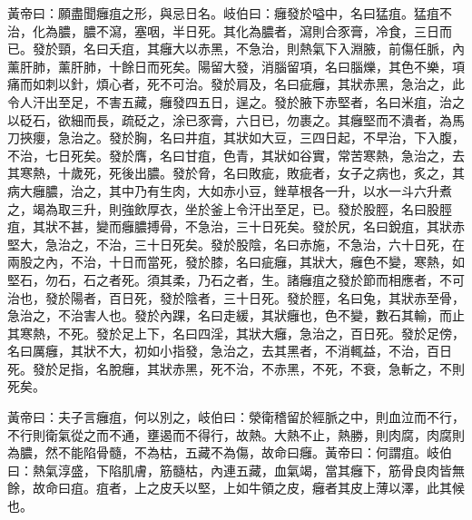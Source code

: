 黃帝曰：願盡聞癰疽之形，與忌日名。岐伯曰：癰發於嗌中，名曰猛疽。猛疽不治，化為膿，膿不瀉，塞咽，半日死。其化為膿者，瀉則合豕膏，冷食，三日而已。發於頸，名曰夭疽，其癰大以赤黑，不急治，則熱氣下入淵腋，前傷任脈，內薰肝肺，薰肝肺，十餘日而死矣。陽留大發，消腦留項，名曰腦爍，其色不樂，項痛而如刺以針，煩心者，死不可治。發於肩及，名曰疵癰，其狀赤黑，急治之，此令人汗出至足，不害五藏，癰發四五日，逞之。發於腋下赤堅者，名曰米疽，治之以砭石，欲細而長，疏砭之，涂已豕膏，六日已，勿裹之。其癰堅而不潰者，為馬刀挾癭，急治之。發於胸，名曰井疽，其狀如大豆，三四日起，不早治，下入腹，不治，七日死矣。發於膺，名曰甘疽，色青，其狀如谷實，常苦寒熱，急治之，去其寒熱，十歲死，死後出膿。發於脅，名曰敗疵，敗疵者，女子之病也，炙之，其病大癰膿，治之，其中乃有生肉，大如赤小豆，銼草根各一升，以水一斗六升煮之，竭為取三升，則強飲厚衣，坐於釜上令汗出至足，已。發於股脛，名曰股脛疽，其狀不甚，變而癰膿搏骨，不急治，三十日死矣。發於尻，名曰銳疽，其狀赤堅大，急治之，不治，三十日死矣。發於股陰，名曰赤施，不急治，六十日死，在兩股之內，不治，十日而當死，發於膝，名曰疵癰，其狀大，癰色不變，寒熱，如堅石，勿石，石之者死。須其柔，乃石之者，生。諸癰疽之發於節而相應者，不可治也，發於陽者，百日死，發於陰者，三十日死。發於脛，名曰兔，其狀赤至骨，急治之，不治害人也。發於內踝，名曰走緩，其狀癰也，色不變，數石其輸，而止其寒熱，不死。發於足上下，名曰四淫，其狀大癰，急治之，百日死。發於足傍，名曰厲癰，其狀不大，初如小指發，急治之，去其黑者，不消輒益，不治，百日死。發於足指，名脫癰，其狀赤黑，死不治，不赤黑，不死，不衰，急斬之，不則死矣。

黃帝曰：夫子言癰疽，何以別之，岐伯曰：滎衛稽留於經脈之中，則血泣而不行，不行則衛氣從之而不通，壅遏而不得行，故熱。大熱不止，熱勝，則肉腐，肉腐則為膿，然不能陷骨髓，不為枯，五藏不為傷，故命曰癰。黃帝曰：何謂疽。岐伯曰：熱氣淳盛，下陷肌膚，筋髓枯，內連五藏，血氣竭，當其癰下，筋骨良肉皆無餘，故命曰疽。疽者，上之皮夭以堅，上如牛領之皮，癰者其皮上薄以澤，此其候也。
